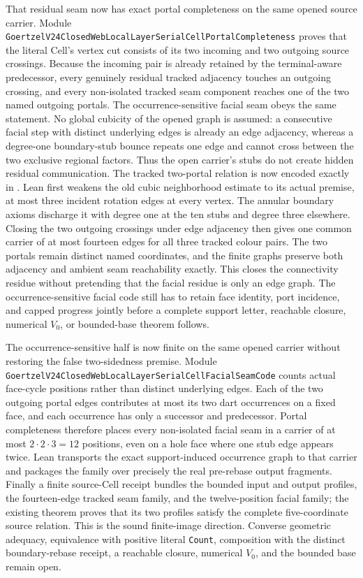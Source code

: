 \documentclass[11pt]{article}
\theoremstyle{definition}
\begin{document}
That residual seam now has exact portal completeness on the same opened
source carrier.  Module
\texttt{GoertzelV24ClosedWebLocalLayerSerialCellPortalCompleteness} proves
that the literal Cell's vertex cut consists of its two incoming and two
outgoing source crossings.  Because the incoming pair is already retained by
the terminal-aware predecessor, every genuinely residual tracked adjacency
touches an outgoing crossing, and every non-isolated tracked seam component
reaches one of the two named outgoing portals.  The occurrence-sensitive
facial seam obeys the same statement.  No global cubicity of the opened graph
is assumed: a consecutive facial step with distinct underlying edges is
already an edge adjacency, whereas a degree-one boundary-stub bounce repeats
one edge and cannot cross between the two exclusive regional factors.  Thus
the open carrier's stubs do not create hidden residual communication.  The
tracked two-portal relation is now encoded exactly in
.
Lean first weakens the old cubic neighborhood estimate to its actual premise,
at most three incident rotation edges at every vertex.  The annular boundary
axioms discharge it with degree one at the ten stubs and degree three
elsewhere.  Closing the two outgoing crossings under edge adjacency then
gives one common carrier of at most fourteen edges for all three tracked
colour pairs.  The two portals remain distinct named coordinates, and the
finite graphs preserve both adjacency and ambient seam reachability exactly.
This closes the connectivity residue without pretending that the facial
residue is only an edge graph.  The occurrence-sensitive facial code still
has to retain face identity, port incidence, and capped progress jointly
before a complete support letter, reachable closure, numerical $V_0$, or
bounded-base theorem follows.

The occurrence-sensitive half is now finite on the same opened carrier
without restoring the false two-sidedness premise.  Module
\texttt{GoertzelV24ClosedWebLocalLayerSerialCellFacialSeamCode} counts actual
face-cycle positions rather than distinct underlying edges.  Each of the two
outgoing portal edges contributes at most its two dart occurrences on a fixed
face, and each occurrence has only a successor and predecessor.  Portal
completeness therefore places every non-isolated facial seam in a carrier of
at most $2\cdot2\cdot3=12$ positions, even on a hole face where one stub edge
appears twice.  Lean transports the exact support-induced occurrence graph to
that carrier and packages the family over precisely the real pre-rebase output
fragments.  Finally a finite source-Cell receipt bundles the bounded input and
output profiles, the fourteen-edge tracked seam family, and the twelve-position
facial family; the existing theorem proves that its two profiles satisfy the
complete five-coordinate source relation.  This is the sound finite-image
direction.  Converse geometric adequacy, equivalence with positive literal
\texttt{Count}, composition with the distinct boundary-rebase receipt, a
reachable closure, numerical $V_0$, and the bounded base remain open.
\end{document}
